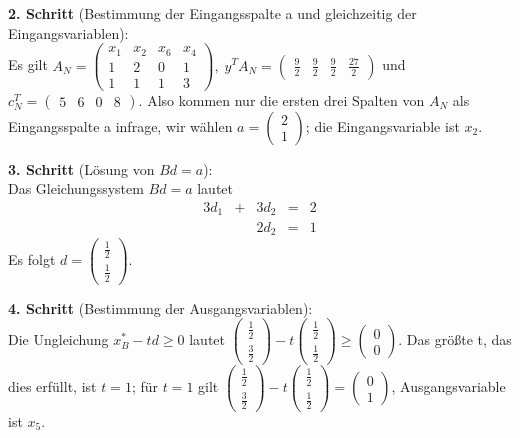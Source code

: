 \documentclass[10pt,a4paper,oneside,ngerman,numbers=noenddot]{scrartcl}
\begin{document}
		\textbf{2. Schritt} (Bestimmung der Eingangsspalte a und gleichzeitig der Eingangsvariablen):\\
		Es gilt $A_{N} = \begin{pmatrix} x_{1} & x_{2} & x_{6} & x_{4} \\ 1 & 2 & 0 & 1 \\ 1 & 1 & 1 & 3 \end{pmatrix},\; y^{T}A_{N} = \begin{pmatrix} \frac{9}{2} & \frac{9}{2} & \frac{9}{2} & \frac{27}{2} \end{pmatrix}$ und $c_{N}^{T} = \begin{pmatrix} 5 & 6 & 0 & 8 \end{pmatrix}$. Also kommen nur die ersten drei Spalten von $A_{N}$ als Eingangsspalte a infrage, wir wählen $a = \begin{pmatrix} 2 \\ 1 \end{pmatrix}$; die Eingangsvariable ist $x_{2}$.
		
		\textbf{3. Schritt} (Lösung von $Bd = a$):\\
		Das Gleichungssystem $Bd = a$ lautet
		\begin{alignat*}{3}
			d_{1} &+& 3d_{2} &=& 2 \\
			&& 2d_{2} &=& 1
		\end{alignat*}
		Es folgt $d = \begin{pmatrix}\frac{1}{2} \\ \frac{1}{2}\end{pmatrix}$.
		
		\textbf{4. Schritt} (Bestimmung der Ausgangsvariablen):\\
		Die Ungleichung $x_{B}^{*} - td \geq 0$ lautet $\begin{pmatrix} \frac{1}{2} \\ \frac{3}{2}\end{pmatrix} - t \begin{pmatrix}\frac{1}{2} \\ \frac{1}{2} \end{pmatrix} \geq \begin{pmatrix} 0 \\ 0 \end{pmatrix}$. Das größte t, das dies erfüllt, ist $t = 1$; für $t = 1$ gilt $\begin{pmatrix} \frac{1}{2} \\ \frac{3}{2}\end{pmatrix} - t \begin{pmatrix}\frac{1}{2} \\ \frac{1}{2} \end{pmatrix} = \begin{pmatrix} 0 \\ 1 \end{pmatrix}$, Ausgangsvariable ist $x_{5}$.
		
\end{document}
